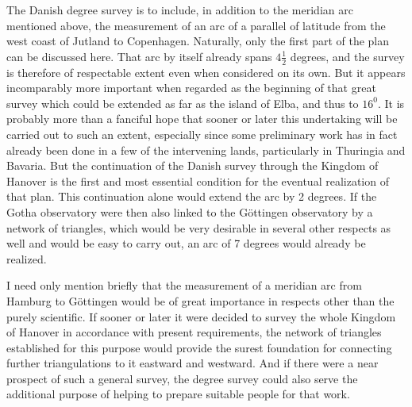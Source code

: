 The Danish degree survey is to include, in addition to the meridian arc mentioned above, the measurement of an arc of a parallel of latitude from the west coast of Jutland to Copenhagen. Naturally, only the first part of the plan can be discussed here. That arc by itself already spans \(4\frac12\) degrees, and the survey is therefore of respectable extent even when considered on its own. But it appears incomparably more important when regarded as the beginning of that great survey which could be extended as far as the island of Elba, and thus to \(16^0\). It is probably more than a fanciful hope that sooner or later this undertaking will be carried out to such an extent, especially since some preliminary work has in fact already been done in a few of the intervening lands, particularly in Thuringia and Bavaria. But the continuation of the Danish survey through the Kingdom of Hanover is the first and most essential condition for the eventual realization of that plan. This continuation alone would extend the arc by 2 degrees. If the Gotha observatory were then also linked to the Göttingen observatory by a network of triangles, which would be very desirable in several other respects as well and would be easy to carry out, an arc of 7 degrees would already be realized.

I need only mention briefly that the measurement of a meridian arc from Hamburg to Göttingen would be of great importance in respects other than the purely scientific. If sooner or later it were decided to survey the whole Kingdom of Hanover in accordance with present requirements, the network of triangles established for this purpose would provide the surest foundation for connecting further triangulations to it eastward and westward. And if there were a near prospect of such a general survey, the degree survey could also serve the additional purpose of helping to prepare suitable people for that work.
